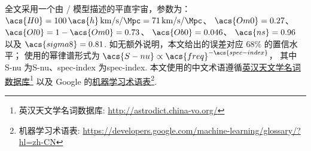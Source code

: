 全文采用一个由 \lcdm/ 模型描述的平直宇宙，参数为：
$\acs{H0} = 100\,\acs{h}\,\si{\km\per\second\per\Mpc}
= \SI{71}{\km\per\second\per\Mpc}$、
$\acs{Om0} = 0.27$、
$\acs{Ol0} = 1 - \acs{Om0} = 0.73$、
$\acs{Ob0} = 0.046$、
$\acs{ns} = 0.96$ 以及 $\acs{sigma8} = 0.81$.
如无额外说明，本文给出的误差对应 68\% 的置信水平；
使用的幂律谱形式为 $\acs{S-nu} \propto \acs{freq}^{-\acs{spec-index}}$，
其中 \acs{S-nu} 为\acl{S-nu}、\acs{spec-index} 为\acl{spec-index}.
本文使用的中文术语遵循\href{%
  http://astrodict.china-vo.org/
}{英汉天文学名词数据库}\footnote{%
  英汉天文学名词数据库:
  \url{http://astrodict.china-vo.org/}}
以及 Google 的\href{%
  https://developers.google.com/machine-learning/glossary/?hl=zh-CN
}{机器学习术语表}\footnote{%
  机器学习术语表:
  \url{https://developers.google.com/machine-learning/glossary/?hl=zh-CN}}.


